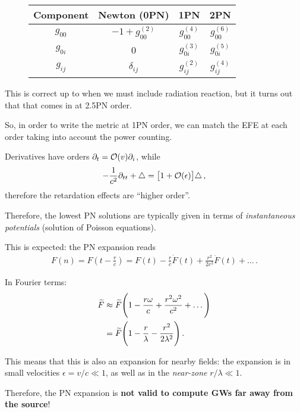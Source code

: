 \documentclass[main.tex]{subfiles}
\begin{document}
\begin{figure}
\centering
\begin{tabular}{c|ccc}
Component & Newton (0PN) & 1PN & 2PN \\
\hline
\(g_{00} \) & \(-1 + g_{00}^{(2)}\) & \(g_{00}^{(4)}\) & \(g_{00}^{(6)}\) \\
\(g_{0i}\) & 0 & \(g_{0i}^{(3)}\) & \(g_{0i}^{(5)}\) \\
\(g_{ij}\) & \(\delta_{ij}\) & \(g_{ij}^{(2)}\) & \(g_{ij}^{(4)}\) 
\end{tabular}
\label{tab:PN-orders}
\caption{}
\end{figure}

This is correct up to when we must include radiation reaction, but it turns out that that comes in at 2.5PN order. 

So, in order to write the metric at 1PN order, we can match the EFE at each order taking into account the power counting. 

Derivatives have orders \(\partial_{t} = \order{v} \partial_{i}\), while 
%
\begin{align}
- \frac{1}{c^2} \partial_{tt} + \triangle = \qty[1 + \order{\epsilon }] \triangle  
\,,
\end{align}
%
therefore the retardation effects are ``higher order''. 

Therefore, the lowest PN solutions are typically given in terms of \emph{instantaneous potentials} (solution of Poisson equations).

This is expected: the PN expansion reads 
%
\begin{align}
F(n) = F( t - \frac{r}{c}) = F(t) - \frac{r}{c} \dot{F} (t) + \frac{r^2}{2 c^2} \ddot{F}( t) + \dots 
\,.
\end{align}

In Fourier terms: 
%
\begin{align}
\widetilde{F} &\approx \widetilde{F} \qty(1 - \frac{r \omega }{c} + \frac{r^2\omega^2}{c^2} + \dots)  \\
&= \widetilde{F} \qty(1 - \frac{r}{\lambda } - \frac{r^2}{2 \lambda^2})
\,.
\end{align}
%

This means that this is also an expansion for nearby fields: the expansion is in small velocities \(\epsilon = v/c \ll 1\), as well as in the \emph{near-zone} \(r / \lambda  \ll 1\). 

Therefore, the PN expansion is \textbf{not valid to compute GWs far away from the source}! 
\end{document}
